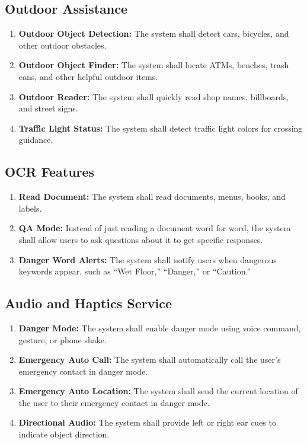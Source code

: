 \documentclass[a4paper]{report}
\begin{document}
\subsection{Outdoor Assistance}

\begin{enumerate}[label=FR-OUT-\arabic*:]
    \item \textbf{Outdoor Object Detection:} The system shall detect cars, bicycles, and other outdoor obstacles.
    \item \textbf{Outdoor Object Finder:} The system shall locate ATMs, benches, trash cans, and other helpful outdoor items.
    \item \textbf{Outdoor Reader:} The system shall quickly read shop names, billboards, and street signs.
    \item \textbf{Traffic Light Status:} The system shall detect traffic light colors for crossing guidance.
\end{enumerate}

\subsection{OCR Features}

\begin{enumerate}[label=FR-OCR-\arabic*:]
    \item \textbf{Read Document:} The system shall read documents, menus, books, and labels.
    \item \textbf{QA Mode:} Instead of just reading a document word for word, the system shall allow users to ask questions about it to get specific responses.
    \item \textbf{Danger Word Alerts:} The system shall notify users when dangerous keywords appear, such as ``Wet Floor,'' ``Danger,'' or ``Caution.''
\end{enumerate}

\subsection{Audio and Haptics Service}

\begin{enumerate}[label=FR-AH-\arabic*:]
    \item \textbf{Danger Mode:} The system shall enable danger mode using voice command, gesture, or phone shake.
    \item \textbf{Emergency Auto Call:} The system shall automatically call the user's emergency contact in danger mode.
    \item \textbf{Emergency Auto Location:} The system shall send the current location of the user to their emergency contact in danger mode.
    \item \textbf{Directional Audio:} The system shall provide left or right ear cues to indicate object direction.
\end{enumerate}
\end{document}
